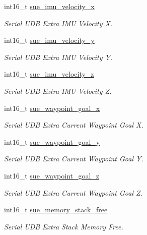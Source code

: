 \begin{DoxyCompactItemize}
int16\+\_\+t \hyperlink{struct____mavlink__serial__udb__extra__f2__b__t_a91c355bbde14cd072cd5839633e16eb2}{sue\+\_\+imu\+\_\+velocity\+\_\+x}
\begin{DoxyCompactList}\small\item\em Serial U\+D\+B Extra I\+M\+U Velocity X. \end{DoxyCompactList}\item 
int16\+\_\+t \hyperlink{struct____mavlink__serial__udb__extra__f2__b__t_a90caef9f250cadf1487324af4be182d8}{sue\+\_\+imu\+\_\+velocity\+\_\+y}
\begin{DoxyCompactList}\small\item\em Serial U\+D\+B Extra I\+M\+U Velocity Y. \end{DoxyCompactList}\item 
int16\+\_\+t \hyperlink{struct____mavlink__serial__udb__extra__f2__b__t_aa8759e5895205f9739814d33b51ba5d6}{sue\+\_\+imu\+\_\+velocity\+\_\+z}
\begin{DoxyCompactList}\small\item\em Serial U\+D\+B Extra I\+M\+U Velocity Z. \end{DoxyCompactList}\item 
int16\+\_\+t \hyperlink{struct____mavlink__serial__udb__extra__f2__b__t_a930a71155eeb46a05a92f2f296945749}{sue\+\_\+waypoint\+\_\+goal\+\_\+x}
\begin{DoxyCompactList}\small\item\em Serial U\+D\+B Extra Current Waypoint Goal X. \end{DoxyCompactList}\item 
int16\+\_\+t \hyperlink{struct____mavlink__serial__udb__extra__f2__b__t_ae534e89f255c22bff11d264207373495}{sue\+\_\+waypoint\+\_\+goal\+\_\+y}
\begin{DoxyCompactList}\small\item\em Serial U\+D\+B Extra Current Waypoint Goal Y. \end{DoxyCompactList}\item 
int16\+\_\+t \hyperlink{struct____mavlink__serial__udb__extra__f2__b__t_a060b4ad9a0823ca1bdfc6ec2583db2a8}{sue\+\_\+waypoint\+\_\+goal\+\_\+z}
\begin{DoxyCompactList}\small\item\em Serial U\+D\+B Extra Current Waypoint Goal Z. \end{DoxyCompactList}\item 
int16\+\_\+t \hyperlink{struct____mavlink__serial__udb__extra__f2__b__t_a43f46ba752fb87d0ada0a74f97712ed4}{sue\+\_\+memory\+\_\+stack\+\_\+free}
\begin{DoxyCompactList}\small\item\em Serial U\+D\+B Extra Stack Memory Free. \end{DoxyCompactList}\end{DoxyCompactItemize}


